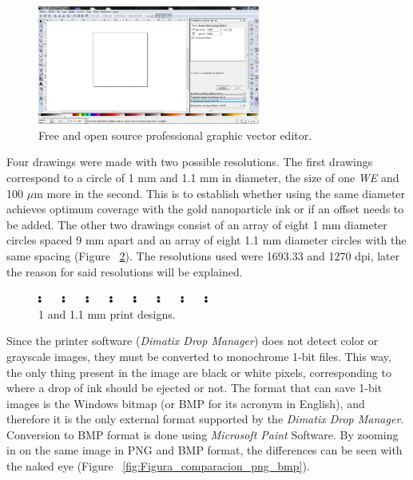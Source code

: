 \begin{figure}[H]
  \centering
    \includegraphics[width=0.65\textwidth]{Figures/Figura_Inkscape}
  \caption{Free and open source professional graphic vector editor.}
  \label{fig:Figura_Inkscape}
\end{figure}

Four drawings were made with two possible resolutions. The first drawings correspond to a circle of 1 mm and 1.1 mm in diameter, the size of one \emph{WE} and 100 $\mu$m more in the second. This is to establish whether using the same diameter achieves optimum coverage with the gold nanoparticle ink or if an offset needs to be added. The other two drawings consist of an array of eight 1 mm diameter circles spaced 9 mm apart and an array of eight 1.1 mm diameter circles with the same spacing (Figure ~\ref{fig:Figura_Diseno_Circulos}). The resolutions used were 1693.33 and 1270 dpi, later the reason for said resolutions will be explained.

\begin{figure}[H]
  \centering
    \includegraphics[width=0.5\textwidth]{Figures/Figura_Diseno_Circulos}
  \caption{1 and 1.1 mm print designs.}
  \label{fig:Figura_Diseno_Circulos}
\end{figure}

Since the printer software (\textit{Dimatix Drop Manager}) does not detect color or grayscale images, they must be converted to monochrome 1-bit files. This way, the only thing present in the image are black or white pixels, corresponding to where a drop of ink should be ejected or not. The format that can save 1-bit images is the Windows bitmap (or BMP for its acronym in English), and therefore it is the only external format supported by the \textit{Dimatix Drop Manager}. Conversion to BMP format is done using \textit{Microsoft Paint} Software. By zooming in on the same image in PNG and BMP format, the differences can be seen with the naked eye (Figure ~\ref{fig:Figura_comparacion_png_bmp}).


